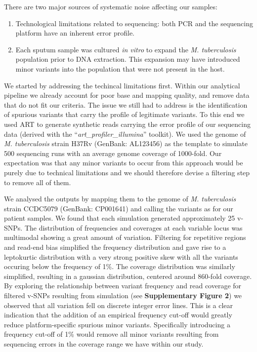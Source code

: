 \documentclass[12pt, oneside]{article}   	%
\begin{document}
\noindent There are two major sources of systematic noise affecting our samples:
\begin{enumerate}
   \item Technological limitations related to sequencing: both PCR and the sequencing platform have an inherent error profile.
   \item Each sputum sample was cultured \textsl{in vitro} to expand the \textsl{M. tuberculosis} population prior to DNA extraction. This expansion may have introduced minor variants into the population that were not present in the host.
\end{enumerate}

We started by addressing the techincal limitations first. Within our analytical pipeline we already account for poor base and mapping quality, and remove data that do not fit our criteria. The issue we still had to address is the identification of spurious variants that carry the profile of legitimate variants. To this end we used ART \cite{ART} to generate synthetic reads carrying the error profile of our sequencing data (derived with the ``\textsl{art\_profiler\_illumina}'' toolkit). We used the genome of \textsl{M. tuberculosis} strain H37Rv (GenBank: AL123456) as the template to simulate 500 sequencing runs with an average genome coverage of 1000-fold. Our expectation was that any minor variants to occur from this approach would be purely due to technical limitations and we should therefore devise a filtering step to remove all of them.

We analysed the outputs by mapping them to the genome of \textsl{M. tuberculosis} strain CCDC5079 (GenBank: CP001641) and calling the variants as for our patient samples. We found that each simulation generated approximately 25 v-SNPs. The distribution of frequencies and coverages at each variable locus was multimodal showing a great amount of variation. Filtering for repetitive regions and read-end bias simplified the frequency distribution and gave rise to a leptokurtic distribution with a very strong positive skew with all the variants occuring below the frequency of 1\%. The coverage distribution was similarly simplified, resulting in a gaussian distribution, centered around 860-fold coverage. By exploring the relationship between variant frequency and read coverage for filtered v-SNPs resulting from simulation (see \textbf{Supplementary Figure 2}) we observed that all variation fell on discrete integer error lines. This is a clear indication that the addition of an empirical frequency cut-off would greatly reduce platform-specific spurious minor variants. Specifically introducing a frequency cut-off of 1\% would remove all minor variants resulting from sequencing errors in the coverage range we have within our study.
\end{document}

